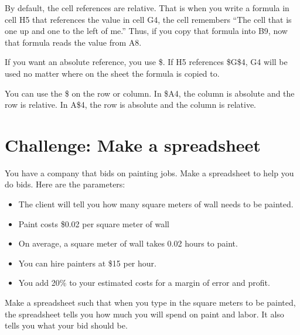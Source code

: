 By default, the cell references are relative.  That is when you write
a formula in cell H5 that references the value in cell G4, the cell
remembers ``The cell that is one up and one to the left of me.''
Thus, if you copy that formula into B9, now that formula reads the
value from A8.

If you want an absolute reference, you use \$.  If H5 references
\$G\$4, G4 will be used no matter where on the sheet the formula is
copied to.

You can use the \$ on the row or column.  In \$A4, the column is
absolute and the row is relative.  In A\$4, the row is absolute and
the column is relative.

\section{Challenge: Make a spreadsheet}

You have a company that bids on painting jobs. Make a
spreadsheet to help you do bids. Here are the parameters:
\begin{itemize}
\item The client will tell you how many square meters of wall needs to be painted.
\item Paint costs \$0.02 per square meter of wall
\item On average, a square meter of wall takes 0.02 hours to paint.
\item You can hire painters at \$15 per hour.
\item You add 20\% to your estimated costs for a margin of error and profit.
\end{itemize}

Make a spreadsheet such that when you type in the square meters to be
painted, the spreadsheet tells you how much you will spend on paint
and labor.  It also tells you what your bid should be.
